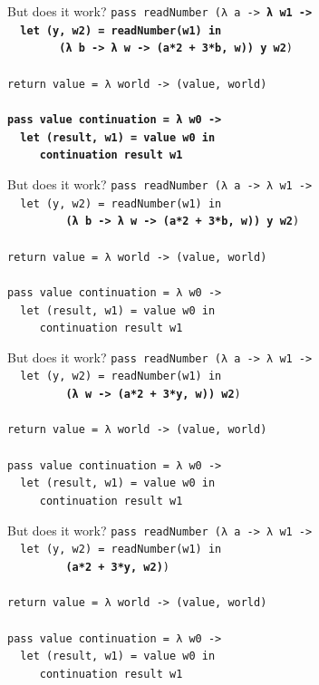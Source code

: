\documentclass{beamer}
\begin{document}
\begin{frame}{But does it work?}
  \texttt{pass readNumber (λ a -> \textbf{λ w1 -> \\
      \ \ let (y, w2) = readNumber(w1) in\\
      \ \ \ \ \ \ \ \ (λ b -> λ w -> (a*2 + 3*b, w)) y w2})\\
    \ \\
    return value = λ world -> (value, world) \\
    \ \\
    \textbf{pass value continuation = λ w0 -> \\
      \ \ let (result, w1) = value w0 in \\
      \ \ \ \ \ continuation result w1}
  }
\end{frame}

\begin{frame}{But does it work?}
  \texttt{pass readNumber (λ a -> λ w1 -> \\
    \ \ let (y, w2) = readNumber(w1) in\\
    \ \ \ \ \ \ \ \ \ \textbf{(λ b -> λ w -> (a*2 + 3*b, w)) y w2})\\
    \ \\
    return value = λ world -> (value, world) \\
    \ \\
    pass value continuation = λ w0 -> \\
    \ \ let (result, w1) = value w0 in \\
    \ \ \ \ \ continuation result w1
  }
\end{frame}

\begin{frame}{But does it work?}
  \texttt{pass readNumber (λ a -> λ w1 -> \\
    \ \ let (y, w2) = readNumber(w1) in\\
    \ \ \ \ \ \ \ \ \ \textbf{(λ w -> (a*2 + 3*y, w)) w2})\\
    \ \\
    return value = λ world -> (value, world) \\
    \ \\
    pass value continuation = λ w0 -> \\
    \ \ let (result, w1) = value w0 in \\
    \ \ \ \ \ continuation result w1
  }
\end{frame}

\begin{frame}{But does it work?}
  \texttt{pass readNumber (λ a -> λ w1 -> \\
    \ \ let (y, w2) = readNumber(w1) in\\
    \ \ \ \ \ \ \ \ \ \textbf{(a*2 + 3*y, w2)})\\
    \ \\
    return value = λ world -> (value, world) \\
    \ \\
    pass value continuation = λ w0 -> \\
    \ \ let (result, w1) = value w0 in \\
    \ \ \ \ \ continuation result w1
  }
\end{frame}
\end{document}
